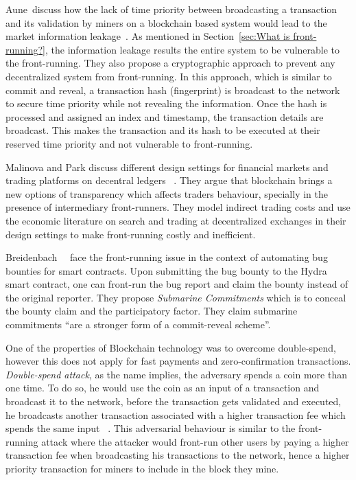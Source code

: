 Aune~\etal discuss how the lack of time priority between broadcasting a transaction and its validation by miners on a blockchain based system would lead to the market information leakage~\cite{aune2017footprints}. As mentioned in Section~\ref{sec:What is front-running?}, the information leakage results the entire system to be vulnerable to the front-running. They also propose a cryptographic approach to prevent any decentralized system from front-running. In this approach, which is similar to commit and reveal, a transaction hash (fingerprint) is broadcast to the network to secure time priority while not revealing the information. Once the hash is processed and assigned an index and timestamp, the transaction details are broadcast. This makes the transaction and its hash to be executed at their reserved time priority and not vulnerable to front-running.

Malinova and Park discuss different design settings for financial markets and trading platforms on decentral ledgers ~\cite{malinova2017market}.  They argue that blockchain brings a new options of transparency which affects traders behaviour, specially in the presence of intermediary front-runners. They model indirect trading costs and use the economic literature on search and trading at decentralized exchanges in their design settings to make front-running costly and inefficient.


Breidenbach~\etal~\cite{breidenbach2018enter} face the front-running issue in the context of automating bug bounties for smart contracts. Upon submitting the bug bounty to the Hydra smart contract, one can front-run the bug report and claim the bounty instead of the original reporter. They propose \textit{Submarine Commitments} which is to conceal the bounty claim and the participatory factor. They claim submarine commitments ``are a stronger form of a commit-reveal scheme''. 

 
One of the properties of Blockchain technology was to overcome double-spend, however this does not apply for fast payments and zero-confirmation transactions. \textit{Double-spend attack}, as the name implies, the adversary spends a coin more than one time. To do so, he would use the coin as an input of a transaction and broadcast it to the network, before the transaction gets validated and executed, he broadcasts another transaction associated with a higher transaction fee which spends the same input ~\cite{bamert2013have, karame2012double}. This adversarial behaviour is similar to the front-running attack where the attacker would front-run other users by paying a higher transaction fee when broadcasting his transactions to the network, hence a higher priority transaction for miners to include in the block they mine.  



